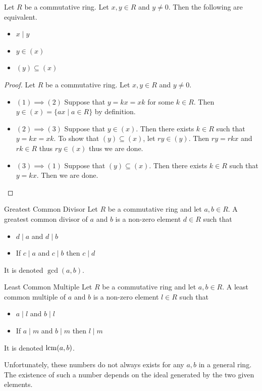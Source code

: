 \documentclass[a4paper]{article}
\begin{document}
\begin{prp}{}{} Let $R$ be a commutative ring. Let $x,y\in R$ and $y\neq 0$. Then the following are equivalent. 
\begin{itemize}
\item $x\;|\;y$
\item $y\in(x)$
\item $(y)\subseteq(x)$
\end{itemize}
\begin{proof} Let $R$ be a commutative ring. Let $x,y\in R$ and $y\neq 0$. 
\begin{itemize}
\item $(1)\implies(2)$ Suppose that $y=kx=xk$ for some $k\in R$. Then $y\in(x)=\{ax\;|\;a\in R\}$ by definition. 
\item $(2)\implies(3)$ Suppose that $y\in(x)$. Then there exists $k\in R$ such that $y=kx=xk$. To show that $(y)\subseteq(x)$, let $ry\in(y)$. Then $ry=rkx$ and $rk\in R$ thus $ry\in(x)$ thus we are done. 
\item $(3)\implies(1)$ Suppose that $(y)\subseteq(x)$. Then there exists $k\in R$ such that $y=kx$. Then we are done. 
\end{itemize}
\end{proof}
\end{prp}

\begin{defn}{Greatest Common Divisor}{} Let $R$ be a commutative ring and let $a,b\in R$. A greatest common divisor of $a$ and $b$ is a non-zero element $d\in R$ such that 
\begin{itemize}
\item $d\;|\;a$ and $d\;|\;b$
\item If $c\;|\;a$ and $c\;|\;b$ then $c\;|\;d$
\end{itemize} It is denoted $\gcd(a,b)$. 
\end{defn}

\begin{defn}{Least Common Multiple}{} Let $R$ be a commutative ring and let $a,b\in R$. A least common multiple of $a$ and $b$ is a non-zero element $l\in R$ such that 
\begin{itemize}
\item $a\;|\;l$ and $b\;|\;l$
\item If $a\;|\;m$ and $b\;|\;m$ then $l\;|\;m$
\end{itemize} It is denoted $\operatorname{lcm}(a,b)$. 
\end{defn}

Unfortunately, these numbers do not always exists for any $a,b$ in a general ring. The existence of such a number depends on the ideal generated by the two given elements. 
\end{document}
